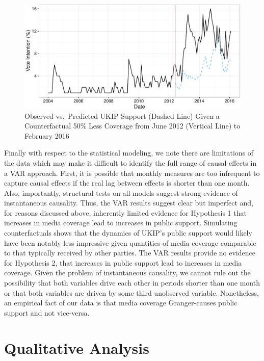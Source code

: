 \documentclass[12pt,]{article}
\makeatletter
\def\maxwidth{\ifdim\Gin@nat@width>\linewidth\linewidth
\else\Gin@nat@width\fi}
\let\Oldincludegraphics\includegraphics
\renewcommand{\includegraphics}[1]{\Oldincludegraphics[width=\maxwidth]{#1}}
\makeatother
\begin{document}
\begin{figure}[htbp]
\centering
\includegraphics{ukip_media_files/figure-latex/predicted-plot2-1.pdf}
\caption{Observed vs.~Predicted UKIP Support (Dashed Line) Given a
Counterfactual 50\% Less Coverage from June 2012 (Vertical Line) to
February 2016}
\end{figure}

Finally with respect to the statistical modeling, we note there are
limitations of the data which may make it difficult to identify the full
range of causal effects in a VAR approach. First, it is possible that
monthly measures are too infrequent to capture causal effects if the
real lag between effects is shorter than one month. Also, importantly,
structural tests on all models suggest strong evidence of instantaneous
causality. Thus, the VAR results suggest clear but imperfect and, for
reasons discussed above, inherently limited evidence for Hypothesis 1
that increases in media coverage lead to increases in public support.
Simulating counterfactuals shows that the dynamics of UKIP's public
support would likely have been notably less impressive given quantities
of media coverage comparable to that typically received by other
parties. The VAR results provide no evidence for Hypothesis 2, that
increases in public support lead to increases in media coverage. Given
the problem of instantaneous causality, we cannot rule out the
possibility that both variables drive each other in periods shorter than
one month or that both variables are driven by some third unobserved
variable. Nonetheless, an empirical fact of our data is that media
coverage Granger-causes public support and not vice-versa.

\section{Qualitative Analysis}\label{qualitative-analysis}
\end{document}
